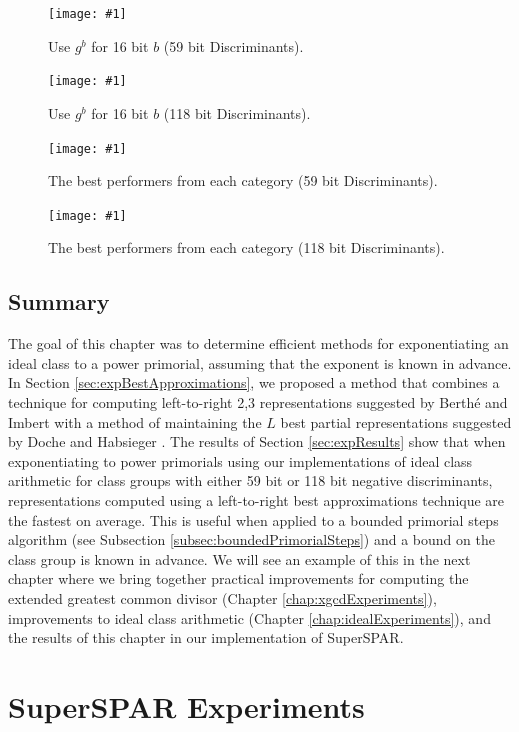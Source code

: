 \documentclass{ucalgthes1}
\theoremstyle{definition}
\newcommand{\mygraph}[3]{
	\begin{figure}[htb]
	\centering
	\texttt{[image: \#1]}
	\caption{#3}
	\label{#2}
	\end{figure}
}
\begin{document}
\mygraph{block_vs_list-64}{fig:expBlockList64}{Use $g^b$ for 16 bit $b$ (59 bit Discriminants).}
\mygraph{block_vs_list-128}{fig:expBlockList128}{Use $g^b$ for 16 bit $b$ (118 bit Discriminants).}

\mygraph{winners-64}{fig:expWinners64}{The best performers from each category (59 bit Discriminants).}
\mygraph{winners-128}{fig:expWinners128}{The best performers from each category (118 bit Discriminants).}

\clearpage


\section{Summary}

The goal of this chapter was to determine efficient methods for exponentiating an ideal class to a power primorial, assuming that the exponent is known in advance.  In Section \ref{sec:expBestApproximations}, we proposed a method that combines a technique for computing left-to-right 2,3 representations suggested by Berth{\'e} and Imbert \cite{Berthe2009} with a method of maintaining the $L$ best partial representations suggested by Doche and Habsieger \cite{Doche2008}.  The results of Section \ref{sec:expResults} show that when exponentiating to power primorials using our implementations of ideal class arithmetic for class groups with either 59 bit or 118 bit negative discriminants, representations computed using a left-to-right best approximations technique are the fastest on average.  This is useful when applied to a bounded primorial steps algorithm (see Subsection \ref{subsec:boundedPrimorialSteps}) and a bound on the class group is known in advance.  We will see an example of this in the next chapter where we bring together practical improvements for computing the extended greatest common divisor (Chapter \ref{chap:xgcdExperiments}), improvements to ideal class arithmetic (Chapter \ref{chap:idealExperiments}), and the results of this chapter in our implementation of SuperSPAR.


\chapter{SuperSPAR Experiments}
\label{chap:ssparExperiments}
\end{document}
